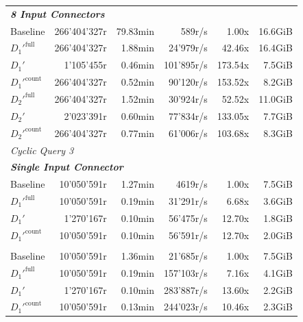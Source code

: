 \begin{longtable}{lrrrrr}
    \multicolumn{6}{l}{\textit{\textbf{8 Input Connectors}}} \\
    \nopagebreak
    Baseline              &  266'404'327r         &  79.83min           &  589r/s              & 1.00x             & 16.6GiB   \\
    $D_1'^{\text{full}}$   &  266'404'327r         &  1.88min            &  24'979r/s           & 42.46x            & 16.4GiB   \\
    \quad $D_1'$           &  1'105'455r           &  0.46min            &  101'895r/s          & 173.54x           & 7.5GiB    \\
    $D_1'^{\text{count}}$  &  266'404'327r         &  0.52min            &  90'120r/s           & 153.52x           & 8.2GiB    \\
    $D_2'^{\text{full}}$   &  266'404'327r         &  1.52min            &  30'924r/s           & 52.52x            & 11.0GiB   \\
    \quad $D_2'$           &  2'023'391r           &  0.60min            &  77'834r/s           & 133.05x           & 7.7GiB    \\
    $D_2'^{\text{count}}$  &  266'404'327r         &  0.77min            &  61'006r/s           & 103.68x           & 8.3GiB    \\
    \midrule
    
    \multicolumn{6}{l}{\textit{Cyclic Query 3}} \\
    \midrule
    \multicolumn{6}{l}{\textit{\textbf{Single Input Connector}}} \\
    \nopagebreak
    Baseline              &  10'050'591r          &  1.27min             &  4619r/s             & 1.00x             & 7.5GiB    \\
    $D_1'^{\text{full}}$   &  10'050'591r          &  0.19min             &  31'291r/s           & 6.68x             & 3.6GiB    \\
    \quad $D_1'$           &  1'270'167r           &  0.10min             &  56'475r/s           & 12.70x            & 1.8GiB    \\
    $D_1'^{\text{count}}$  &  10'050'591r          &  0.10min             &  56'591r/s           & 12.70x            & 2.0GiB    \\
    \addlinespace 
    
    \multicolumn{6}{l}{\textit{\textbf{5 Input Connectors}}} \\
    \nopagebreak
    Baseline              &  10'050'591r          &  1.36min             &  21'685r/s           & 1.00x             & 7.5GiB    \\
    $D_1'^{\text{full}}$   &  10'050'591r          &  0.19min             &  157'103r/s          & 7.16x             & 4.1GiB    \\
    \quad $D_1'$           &  1'270'167r           &  0.10min             &  283'887r/s          & 13.60x            & 2.2GiB    \\
    $D_1'^{\text{count}}$  &  10'050'591r          &  0.13min             &  244'023r/s          & 10.46x            & 2.3GiB    \\
    \midrule
    

\end{longtable}
